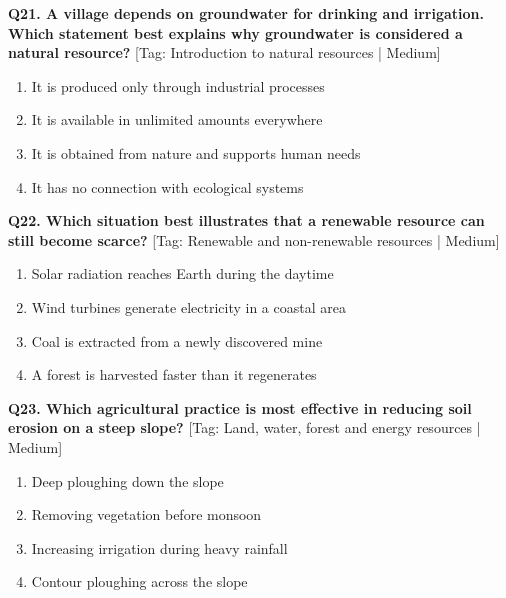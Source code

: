 \noindent\textbf{Q21. A village depends on groundwater for drinking and irrigation. Which statement best explains why groundwater is considered a natural resource?} \hfill [Tag: Introduction to natural resources | Medium]
\begin{enumerate}[label=(\alph*),topsep=2pt,itemsep=1pt,partopsep=0pt,parsep=0pt]
    \item {It is produced only through industrial processes}
    \item {It is available in unlimited amounts everywhere}
    \item {It is obtained from nature and supports human needs}
    \item {It has no connection with ecological systems}
\end{enumerate}
\vspace{2mm}

\noindent\textbf{Q22. Which situation best illustrates that a renewable resource can still become scarce?} \hfill [Tag: Renewable and non-renewable resources | Medium]
\begin{enumerate}[label=(\alph*),topsep=2pt,itemsep=1pt,partopsep=0pt,parsep=0pt]
    \item {Solar radiation reaches Earth during the daytime}
    \item {Wind turbines generate electricity in a coastal area}
    \item {Coal is extracted from a newly discovered mine}
    \item {A forest is harvested faster than it regenerates}
\end{enumerate}
\vspace{2mm}

\noindent\textbf{Q23. Which agricultural practice is most effective in reducing soil erosion on a steep slope?} \hfill [Tag: Land, water, forest and energy resources | Medium]
\begin{enumerate}[label=(\alph*),topsep=2pt,itemsep=1pt,partopsep=0pt,parsep=0pt]
    \item {Deep ploughing down the slope}
    \item {Removing vegetation before monsoon}
    \item {Increasing irrigation during heavy rainfall}
    \item {Contour ploughing across the slope}
\end{enumerate}
\vspace{2mm}

